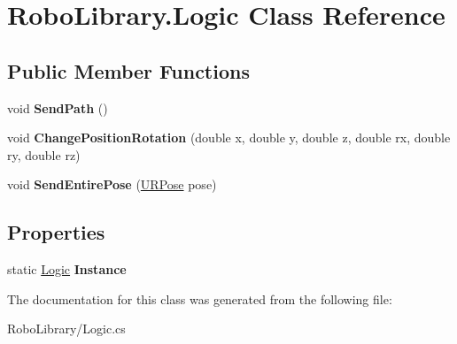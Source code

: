 \hypertarget{class_robo_library_1_1_logic}{}\section{Robo\+Library.\+Logic Class Reference}
\label{class_robo_library_1_1_logic}
\subsection*{Public Member Functions}
\begin{DoxyCompactItemize}
\item 
\hypertarget{class_robo_library_1_1_logic_a800b2c4e7162b056f8583735a16bc2a9}{}\label{class_robo_library_1_1_logic_a800b2c4e7162b056f8583735a16bc2a9} 
void {\bfseries Send\+Path} ()
\item 
\hypertarget{class_robo_library_1_1_logic_a542ef7edd76d25a6a4db00b64f73d181}{}\label{class_robo_library_1_1_logic_a542ef7edd76d25a6a4db00b64f73d181} 
void {\bfseries Change\+Position\+Rotation} (double x, double y, double z, double rx, double ry, double rz)
\item 
\hypertarget{class_robo_library_1_1_logic_a7cfcf222169cf0a16e6957915207a551}{}\label{class_robo_library_1_1_logic_a7cfcf222169cf0a16e6957915207a551} 
void {\bfseries Send\+Entire\+Pose} (\hyperlink{class_robo_library_1_1_u_r_pose}{U\+R\+Pose} pose)
\end{DoxyCompactItemize}
\subsection*{Properties}
\begin{DoxyCompactItemize}
\item 
\hypertarget{class_robo_library_1_1_logic_a4849fb6b77299570d18ceb82943a4aa7}{}\label{class_robo_library_1_1_logic_a4849fb6b77299570d18ceb82943a4aa7} 
static \hyperlink{class_robo_library_1_1_logic}{Logic} {\bfseries Instance}
\end{DoxyCompactItemize}


The documentation for this class was generated from the following file\+:\begin{DoxyCompactItemize}
\item 
Robo\+Library/Logic.\+cs\end{DoxyCompactItemize}
